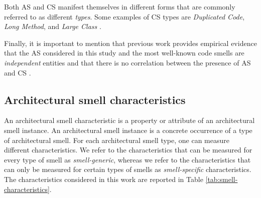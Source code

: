 Both AS and CS manifest themselves in different forms that are commonly referred to as different \emph{types}.
Some examples of CS types are \emph{Duplicated Code}, \emph{Long Method}, and \emph{Large Class} \cite{Fowler2002}.

Finally, it is important to mention that previous work provides empirical evidence that the AS  considered in this study and the most well-known code smells are \emph{independent} entities and that there is no correlation between the presence of AS and CS \cite{Arcelli2019}.

\subsection{Architectural smell characteristics}\label{c2:sec:smell-characteristics}
An architectural smell characteristic is a property or attribute of an architectural smell instance. 
An architectural smell instance is a concrete occurrence of a type of architectural smell.
For each architectural smell type, one can measure different characteristics. We refer to the characteristics that can be measured for every type of smell as \emph{smell-generic}, whereas we refer to the characteristics that can only be measured for certain types of smells as \emph{smell-specific} characteristics.
The characteristics considered in this work are reported in Table \ref{tab:smell-characteristics}.

